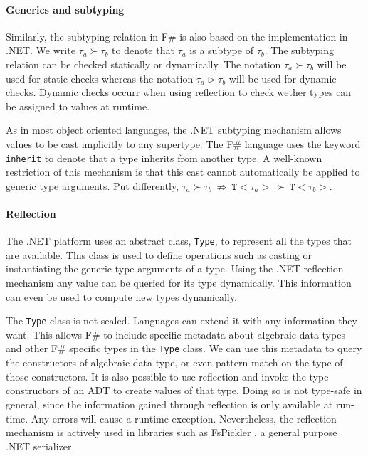 \documentclass{sigplanconf}
\begin{document}
\paragraph{Generics and subtyping}

Similarly, the subtyping relation in F\# is also based on the
implementation in .NET.  We write $\tau_a \succ \tau_b$ to denote that
$\tau_a$ is a subtype of $\tau_b$. The subtyping relation can be
checked statically or dynamically. The notation $\tau_a \succ \tau_b$
will be used for static checks whereas the notation $\tau_a \triangleright \tau_b$
will be used for dynamic checks. Dynamic checks occurr when using reflection
to check wether types can be assigned to values at runtime.

As in most object oriented languages, the .NET subtyping mechanism
allows values to be cast implicitly to any supertype.  The F\#
language uses the keyword \verb+inherit+ to denote that a type
inherits from another type. A well-known restriction of this mechanism
is that this cast cannot automatically be applied to generic type
arguments. Put differently, $\tau_a \succ \tau_b\ \not\Rightarrow\
\mathtt{T}{<}\tau_a{>} \ \succ \ \mathtt{T}{<}\tau_b{>}$.

\paragraph{Reflection}

The .NET platform uses an abstract class, \verb+Type+, to represent
all the types that are available. This class is used to define
operations such as casting or instantiating the generic type arguments
of a type. Using the .NET reflection mechanism any value can be
queried for its type dynamically. This information can even be used to
compute new types dynamically.

The \verb+Type+ class is not sealed. Languages can extend it with any
information they want. This allows F\# to include specific metadata
about algebraic data types and other F\# specific types in the
\verb+Type+ class.  We can use this metadata to query the constructors
of algebraic data type, or even pattern match on the type of those
constructors. It is also possible to use reflection and invoke the
type constructors of an ADT to create values of that type. Doing
so is not type-safe in general, since the information gained through
reflection is only available at run-time. Any errors will cause a
runtime exception. Nevertheless, the reflection mechanism is actively
used in libraries such as FsPickler \cite{FsPickler}, a general
purpose .NET serializer.
\end{document}
